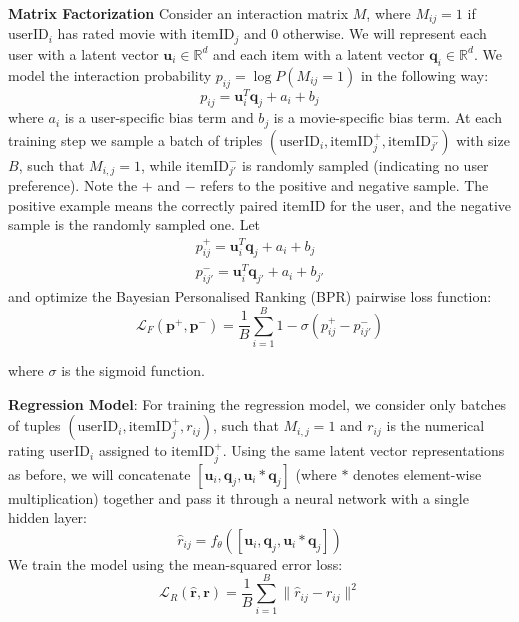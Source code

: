 \vspace{0.2cm}
\noindent\textbf{Matrix Factorization}
Consider an interaction matrix $M$, where $M_{ij} = 1$ if $\text{userID}_i$ has rated movie with $\text{itemID}_j$ and $0$ otherwise. We will represent each user with a latent vector $\mathbf{u}_i\in\mathbb{R}^d$ and each item with a latent vector $\mathbf{q}_i\in\mathbb{R}^d$. We model the interaction probability $p_{ij}=\log P(M_{ij}=1)$ in the following way:
\begin{equation}
    p_{ij} = \mathbf{u}_i^T\mathbf{q}_j + a_i + b_j
    \label{eq:prob}
\end{equation}
where $a_i$ is a user-specific bias term and $b_j$ is a movie-specific bias term. At each training step we sample a batch of triples $(\text{userID}_i, \text{itemID}_j^+, \text{itemID}_{j'}^-)$ with size $B$, such that $M_{i, j} = 1$, while $\text{itemID}_{j'}^-$ is randomly sampled (indicating no user preference). Note the $+$ and $-$ refers to the positive and negative sample. The positive example means the correctly paired $\text{itemID}$ for the user, and the negative sample is the randomly sampled one. Let
\begin{equation} 
    \begin{split}
        p^+_{ij} =  \mathbf{u}_i^T\mathbf{q}_j + a_i + b_j \\
        p^-_{ij'} =  \mathbf{u}_i^T\mathbf{q}_{j'} + a_i + b_{j'}
    \end{split}
\label{eq:p}
\end{equation}
and optimize the  Bayesian Personalised Ranking (BPR) \cite{Rendle2009BPR} pairwise loss function:
\begin{equation}
    \mathcal{L}_F(\mathbf{p}^+, \mathbf{p}^-)=\frac{1}{B}\sum_{i=1}^B 1-\sigma(p_{ij}^+-p_{ij'}^-)
    \label{eq:l1}
\end{equation}

 where $\sigma$ is the sigmoid function.

\vspace{0.2cm}
\noindent\textbf{Regression Model}: For training the regression model, we consider only batches of tuples $(\text{userID}_i, \text{itemID}_j^+, r_{ij})$, such that $M_{i, j} = 1$ and $r_{ij}$ is the numerical rating $\text{userID}_i$ assigned to $\text{itemID}_j^+$. Using the same latent vector representations as before, we will concatenate $[\mathbf{u}_i, \mathbf{q}_j, \mathbf{u}_i * \mathbf{q}_j]$ (where $*$ denotes element-wise multiplication) together and pass it through a neural network with a single hidden layer:
\begin{equation}
    \hat{r}_{ij}=f_{\theta}([\mathbf{u}_i, \mathbf{q}_j, \mathbf{u}_i * \mathbf{q}_j])
    \label{eq:reg}
\end{equation}
We train the model using the mean-squared error loss:
\begin{equation}
    \mathcal{L}_R(\mathbf{\hat{r}}, \mathbf{r})= \frac{1}{B}\sum_{i=1}^B \|\hat{r}_{ij}-r_{ij}\|^2
    \label{eq:r}
\end{equation}

